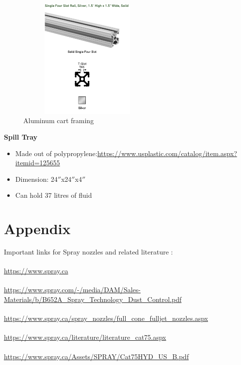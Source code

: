\begin{figure}[!htpb]
  \centering
  \includegraphics[width = 7cm, height=6cm ]{figures/frame}
  \caption{Aluminum cart framing}
  \label{fig:frame}
\end{figure}

\textbf{Spill Tray}
\begin{itemize}
\item Made out of polypropylene:\url{https://www.usplastic.com/catalog/item.aspx?itemid=125655}
\item Dimension: 24$''$x24$''$x4$''$
\item Can hold 37 litres of fluid\\
\end{itemize}


\section{Appendix}
Important links for Spray nozzles and related literature :\\
\\
\url{https://www.spray.ca}\\
\\
\url{https://www.spray.com/-/media/DAM/Sales-Materials/b/B652A_Spray_Technology_Dust_Control.pdf}\\
\\
\url{https://www.spray.ca/spray_nozzles/full_cone_fulljet_nozzles.aspx}\\
\\
\url{https://www.spray.ca/literature/literature_cat75.aspx}\\
\\
\url{https://www.spray.ca/Assets/SPRAY/Cat75HYD_US_B.pdf}\\
\\



 














